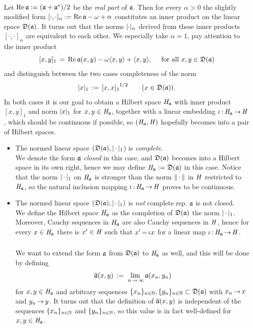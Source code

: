 \documentclass[11pt,twoside]{article}
\begin{document}
\paragraph*{} %
Let $\operatorname{Re} \mathfrak{a} := (\mathfrak{a} + \mathfrak{a}^*)/2$ be the \textit{real part} of $\mathfrak{a}$.
Then for every $\alpha > 0$ the slightly modified form
$[\cdot,\cdot]_{\alpha} := \operatorname{Re} \mathfrak{a} - \omega + \alpha$
constitutes an inner product on the linear space $\mathfrak{D}(\mathfrak{a})$.
It turns out
that the norms $\abs{\cdot} _{\alpha}$
derived from these inner products $[\cdot,\cdot]_{\alpha}$
are equivalent to each other.
We especially take $\alpha=1$,
pay attention to the inner product
\[
[x,y]_1 \,=\, \operatorname{Re} \mathfrak{a}(x,y) - \omega \langle x,y \rangle + \langle x,y \rangle,
\quad \mbox{ for all } x,y \in \mathfrak{D}(\mathfrak{a})
\]
and distinguish between the two cases {\wrt} completeness of the norm
\[
\abs{x} _1 \eqdef {[x,x]_1}^{1/2}
\quad \quad (x \in \domain{\sql}).
\]
In both cases it is our goal to obtain a Hilbert space $\mathit{H}_{\mathfrak{a}}$
with inner product $[x,y]_1$ and norm $\abs{x} _1$
for $x,y \in \mathit{H}_{\mathfrak{a}}$,
together with a linear embedding $\iota{\,:\,}\mathit{H}_{\mathfrak{a}} {\,\to\,} \mathit{H}$,
which should be continuous if possible,
so $(\mathit{H}_{\mathfrak{a}},\mathit{H})$ hopefully becomes into a pair of Hilbert spaces.

\begin{itemize}[leftmargin=5mm]
\item[1.]
The normed linear space $(\domain{\sql},\abs{\,\cdot\,} _1$)
is \textit{complete}.\\
We denote the form $\mathfrak{a}$ \textit{closed} in this case,
and $\mathfrak{D}(\mathfrak{a})$ becomes into a Hilbert space in its own right,
hence we may define $\mathit{H}_{\mathfrak{a}} := \mathfrak{D}(\mathfrak{a})$ in this case. 
Notice that the norm $\abs{\,\cdot\,} _1$ on $\mathit{H}_{\mathfrak{a}}$
is stronger than the norm $\left\lVert \,\cdot\, \right\rVert$ in $\mathit{H}$
restricted to $\mathit{H}_{\mathfrak{a}}$,
so the natural inclusion mapping $\iota{\,:\,} \mathit{H}_{\mathfrak{a}} {\,\to\,} \mathit{H}$
proves to be continuous.

\item[2.]
The normed linear space $(\domain{\sql},\abs{\,\cdot\,} _1)$
is \textit{not} complete rsp. $\mathfrak{a}$ is not closed.\\
We define the Hilbert space $\mathit{H}_{\mathfrak{a}}$ as the completion
of $\mathfrak{D}(\mathfrak{a})$ {\wrt} the norm $\abs{\,\cdot\,} _1$.
Moreover,
Cauchy sequences in $\mathit{H}_{\mathfrak{a}}$ are also Cauchy sequences in $\mathit{H}$,
hence for every $x \in \mathit{H}_{\mathfrak{a}}$
there is $x' \in \mathit{H}$ such that $x' {\,=\,} \iota x$
for a linear map $\iota{\,:\,}\mathit{H}_{\mathfrak{a}} {\,\to\,} \mathit{H}$.

\subparagraph*{}
We want to extend the form $\mathfrak{a}$ from $\mathfrak{D}(\mathfrak{a})$ to $\mathit{H}_{\mathfrak{a}}$
as well,
and this will be done by defining
\[
\overline{\mathfrak{a}}(x,y) \,:=\, \lim_{\,n {\,\to\,} \infty} \mathfrak{a}(x_n,y_n)
\]
for $x,y \in \mathit{H}_{\mathfrak{a}}$ and arbitrary sequences
$\{x_n\}_{n \in {\mathbb{N}}}, \{y_n\}_{n \in {\mathbb{N}}} \subset \mathfrak{D}(\mathfrak{a})$
with $x_n {\,\to\,} x$ and $y_n {\,\to\,} y$.
It turns out that
the definition of $\overline{\mathfrak{a}}(x,y)$ is independent of
the sequences $\{x_n\}_{n \in {\mathbb{N}}}$ and $\{y_n\}_{n \in {\mathbb{N}}}$,
so this value is in fact well-defined for $x,y \in \mathit{H}_{\mathfrak{a}}$.
\end{itemize}
\end{document}
